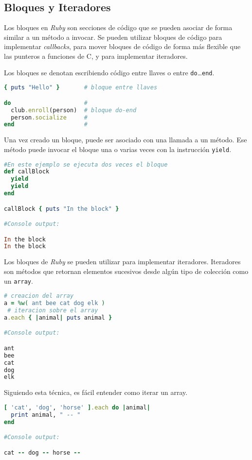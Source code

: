 \subsection{Bloques y Iteradores}
Los bloques en \textit{Ruby} son secciones de código que se pueden asociar de forma similar a un método a invocar. Se pueden utilizar bloques de código para implementar \textit{callbacks}, para mover bloques de código de forma más flexible que las punteros a funciones de C, y para implementar iteradores.

Los bloques se denotan escribiendo código entre llaves o entre \texttt{do}\ldots\texttt{end}.

\begin{lstlisting}[language=Ruby]
{ puts "Hello" }       # bloque entre llaves

do                     #
  club.enroll(person)  # bloque do-end
  person.socialize     #
end                    #
\end{lstlisting} 

Una vez creado un bloque, puede ser asociado con una llamada a un método. Ese método puede invocar el bloque una o varias veces con la instrucción \texttt{yield}.

\begin{lstlisting}[language=Ruby]
#En este ejemplo se ejecuta dos veces el bloque
def callBlock
  yield
  yield
end

callBlock { puts "In the block" }

#Console output:

In the block
In the block
\end{lstlisting}

Los bloques de \textit{Ruby} se pueden utilizar para implementar iteradores. Iteradores son métodos que retornan elementos sucesivos desde algún tipo de colección como un \texttt{array}.

\begin{lstlisting}[language=Ruby]
# creacion del array
a = %w( ant bee cat dog elk )
 # iteracion sobre el array    
a.each { |animal| puts animal } 

#Console output:

ant
bee
cat
dog
elk
\end{lstlisting}

Siguiendo esta técnica, es fácil entender como iterar un array.

\begin{lstlisting}[language=Ruby]
[ 'cat', 'dog', 'horse' ].each do |animal|
  print animal, " -- "
end

#Console output:

cat -- dog -- horse --
\end{lstlisting}

